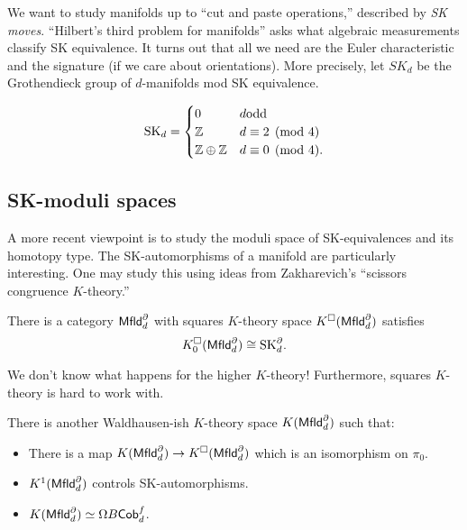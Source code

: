 \documentclass{amsart}
\begin{document}
We want to study manifolds up to ``cut and paste operations,'' described by \emph{SK moves}.
``Hilbert's third problem for manifolds'' asks what algebraic measurements classify SK equivalence.
It turns out that all we need are the Euler characteristic and the signature (if we care about orientations).
More precisely, let $SK_d$ be the Grothendieck group of $d$-manifolds mod SK equivalence.

\begin{thm}
  \[
    \mathrm{SK}_d = \begin{cases}
      0 & d \textrm{odd} \\
      \mathbb{Z} & d \equiv 2 \pmod 4 \\
      \mathbb{Z} \oplus \mathbb{Z} & d \equiv 0 \pmod 4.
    \end{cases}
  \]
\end{thm}

\subsection{SK-moduli spaces}

A more recent viewpoint is to study the moduli space of SK-equivalences and its homotopy type.
The SK-automorphisms of a manifold are particularly interesting.
One may study this using ideas from Zakharevich's ``scissors congruence $K$-theory.''

\begin{thm}
  There is a category $\mathsf{Mfld}_d^\partial$ with squares $K$-theory space $K^\square(\mathsf{Mfld}_d^\partial)$ satisfies
  \[
    K_0^\square(\mathsf{Mfld}_d^\partial) \cong \mathrm{SK}_d^\partial.
  \]
\end{thm}

We don't know what happens for the higher $K$-theory!
Furthermore, squares $K$-theory is hard to work with.

\begin{thm}[C--Sarazola]
  There is another Waldhausen-ish $K$-theory space $K(\mathsf{Mfld}_d^\partial)$ such that:
  \begin{itemize}
    \item There is a map $K(\mathsf{Mfld}_d^\partial) \to K^\square(\mathsf{Mfld}_d^\partial)$ which is an isomorphism on $\pi_0$.
    \item $K^1(\mathsf{Mfld}_d^\partial)$ controls SK-automorphisms.
    \item $K(\mathsf{Mfld}_d^\partial) \simeq \Omega B\mathsf{Cob}_d^f$.
  \end{itemize}
\end{thm}
\end{document}
